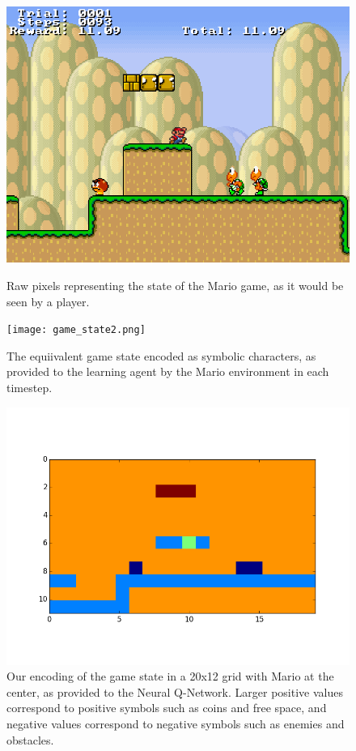\documentclass{article}
\begin{document}
 \begin{figure}
 \begin{center}
\includegraphics[scale=0.35]{mario_screenshot.png}
\caption{Raw pixels representing the state of the Mario game, as it would be seen by a player.}
\texttt{[image: game\_state2.png]}
\caption{The equiivalent game state encoded as symbolic characters, as provided to the learning agent by the Mario environment in each timestep.}
\includegraphics[scale=0.43]{encoded_state.png}
\caption{Our encoding of the game state in a 20x12 grid with Mario at the center, as provided to the Neural Q-Network. Larger positive values correspond to positive symbols such as coins and free space, and negative values correspond to negative symbols such as enemies and obstacles.}
\end{center}
\end{figure}
\end{document}
